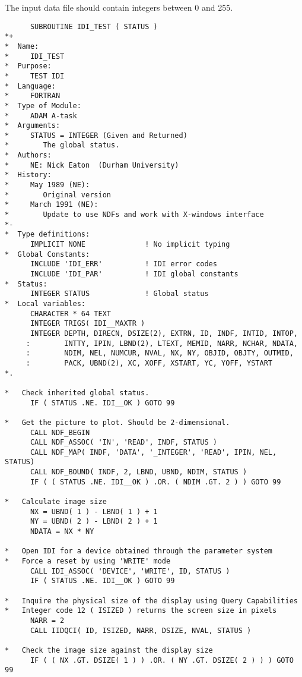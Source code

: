 The input data file should contain integers between 0 and 255.

\begin{small}
\begin{verbatim}
      SUBROUTINE IDI_TEST ( STATUS )
*+
*  Name:
*     IDI_TEST
*  Purpose:
*     TEST IDI
*  Language:
*     FORTRAN
*  Type of Module:
*     ADAM A-task
*  Arguments:
*     STATUS = INTEGER (Given and Returned)
*        The global status.
*  Authors:
*     NE: Nick Eaton  (Durham University)
*  History:
*     May 1989 (NE):
*        Original version
*     March 1991 (NE):
*        Update to use NDFs and work with X-windows interface
*-
*  Type definitions:
      IMPLICIT NONE              ! No implicit typing
*  Global Constants:
      INCLUDE 'IDI_ERR'          ! IDI error codes
      INCLUDE 'IDI_PAR'          ! IDI global constants
*  Status:
      INTEGER STATUS             ! Global status
*  Local variables:
      CHARACTER * 64 TEXT
      INTEGER TRIGS( IDI__MAXTR )
      INTEGER DEPTH, DIRECN, DSIZE(2), EXTRN, ID, INDF, INTID, INTOP,
     :        INTTY, IPIN, LBND(2), LTEXT, MEMID, NARR, NCHAR, NDATA,
     :        NDIM, NEL, NUMCUR, NVAL, NX, NY, OBJID, OBJTY, OUTMID,
     :        PACK, UBND(2), XC, XOFF, XSTART, YC, YOFF, YSTART
*.

*   Check inherited global status.
      IF ( STATUS .NE. IDI__OK ) GOTO 99

*   Get the picture to plot. Should be 2-dimensional.
      CALL NDF_BEGIN
      CALL NDF_ASSOC( 'IN', 'READ', INDF, STATUS )
      CALL NDF_MAP( INDF, 'DATA', '_INTEGER', 'READ', IPIN, NEL, STATUS)
      CALL NDF_BOUND( INDF, 2, LBND, UBND, NDIM, STATUS )
      IF ( ( STATUS .NE. IDI__OK ) .OR. ( NDIM .GT. 2 ) ) GOTO 99

*   Calculate image size
      NX = UBND( 1 ) - LBND( 1 ) + 1
      NY = UBND( 2 ) - LBND( 2 ) + 1
      NDATA = NX * NY

*   Open IDI for a device obtained through the parameter system
*   Force a reset by using 'WRITE' mode
      CALL IDI_ASSOC( 'DEVICE', 'WRITE', ID, STATUS )
      IF ( STATUS .NE. IDI__OK ) GOTO 99

*   Inquire the physical size of the display using Query Capabilities
*   Integer code 12 ( ISIZED ) returns the screen size in pixels
      NARR = 2
      CALL IIDQCI( ID, ISIZED, NARR, DSIZE, NVAL, STATUS )

*   Check the image size against the display size
      IF ( ( NX .GT. DSIZE( 1 ) ) .OR. ( NY .GT. DSIZE( 2 ) ) ) GOTO 99


\end{verbatim}
\end{small}
